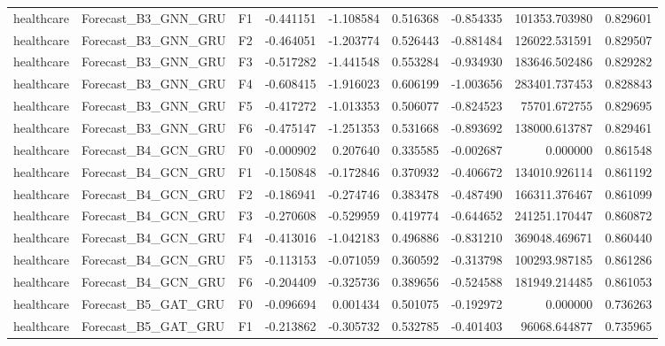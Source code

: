 \begin{tabular}{lllrrrrrr}
healthcare &          Forecast\_B3\_GNN\_GRU &  F1 & -0.441151 & -1.108584 & 0.516368 & -0.854335 &    101353.703980 &             0.829601 \\
healthcare &          Forecast\_B3\_GNN\_GRU &  F2 & -0.464051 & -1.203774 & 0.526443 & -0.881484 &    126022.531591 &             0.829507 \\
healthcare &          Forecast\_B3\_GNN\_GRU &  F3 & -0.517282 & -1.441548 & 0.553284 & -0.934930 &    183646.502486 &             0.829282 \\
healthcare &          Forecast\_B3\_GNN\_GRU &  F4 & -0.608415 & -1.916023 & 0.606199 & -1.003656 &    283401.737453 &             0.828843 \\
healthcare &          Forecast\_B3\_GNN\_GRU &  F5 & -0.417272 & -1.013353 & 0.506077 & -0.824523 &     75701.672755 &             0.829695 \\
healthcare &          Forecast\_B3\_GNN\_GRU &  F6 & -0.475147 & -1.251353 & 0.531668 & -0.893692 &    138000.613787 &             0.829461 \\
healthcare &          Forecast\_B4\_GCN\_GRU &  F0 & -0.000902 &  0.207640 & 0.335585 & -0.002687 &         0.000000 &             0.861548 \\
healthcare &          Forecast\_B4\_GCN\_GRU &  F1 & -0.150848 & -0.172846 & 0.370932 & -0.406672 &    134010.926114 &             0.861192 \\
healthcare &          Forecast\_B4\_GCN\_GRU &  F2 & -0.186941 & -0.274746 & 0.383478 & -0.487490 &    166311.376467 &             0.861099 \\
healthcare &          Forecast\_B4\_GCN\_GRU &  F3 & -0.270608 & -0.529959 & 0.419774 & -0.644652 &    241251.170447 &             0.860872 \\
healthcare &          Forecast\_B4\_GCN\_GRU &  F4 & -0.413016 & -1.042183 & 0.496886 & -0.831210 &    369048.469671 &             0.860440 \\
healthcare &          Forecast\_B4\_GCN\_GRU &  F5 & -0.113153 & -0.071059 & 0.360592 & -0.313798 &    100293.987185 &             0.861286 \\
healthcare &          Forecast\_B4\_GCN\_GRU &  F6 & -0.204409 & -0.325736 & 0.389656 & -0.524588 &    181949.214485 &             0.861053 \\
healthcare &          Forecast\_B5\_GAT\_GRU &  F0 & -0.096694 &  0.001434 & 0.501075 & -0.192972 &         0.000000 &             0.736263 \\
healthcare &          Forecast\_B5\_GAT\_GRU &  F1 & -0.213862 & -0.305732 & 0.532785 & -0.401403 &     96068.644877 &             0.735965 \\

\end{tabular}
